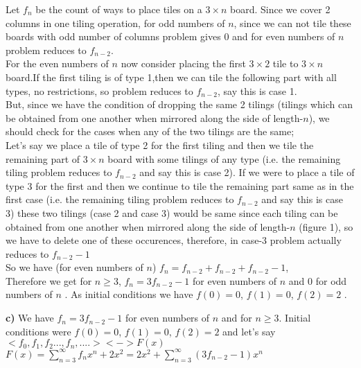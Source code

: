 \documentclass[12pt]{article}
\begin{document}
Let $f_n$ be the count of ways to place tiles on a $3\times n$ board. Since we cover 2 columns in one tiling operation, for odd numbers of $n$, since we can not tile these boards with odd number of columns problem gives $0$ and for even numbers of $n$ problem reduces to $f_{n-2}$.\\
 
For the even numbers of $n$ now consider placing the first $3\times 2$ tile to $3\times n$ board.If the first tiling is of type 1,then we can tile the following part with all types, no restrictions, so problem reduces to $f_{n-2}$, say this is case 1.\\

But, since we have the condition of dropping the same 2 tilings (tilings which can be obtained from one another when mirrored along the side of length-$n$), we should check for the cases when any of the two tilings are the same;\\

Let's say we place a tile of type 2 for the first tiling and then we tile the remaining part of $3\times n$ board with some tilings of any type (i.e. the remaining tiling problem reduces to $f_{n-2}$ and say this is case 2). If we were to place a tile of type 3 for the first and then we continue to tile the remaining part same as in the first case (i.e. the remaining tiling problem reduces to $f_{n-2}$ and say this is case 3) these two tilings (case 2 and case 3) would be same since each tiling can be obtained from one another when mirrored along the side of length-$n$ (figure 1), so we have to delete one of these occurences, therefore, in case-3 problem actually reduces to $f_{n-2}-1$\\

So we have (for even numbers of $n$) $f_n = f_{n-2} + f_{n-2} + f_{n-2}-1$,\\
Therefore we get for $n\geq 3$, $f_n = 3f_{n-2}-1$ for even numbers of $n$ and $0$ for odd numbers of $n$ . As initial conditions we have $f(0)=0$, $f(1)=0$, $f(2)=2$ .

\newpage

\textbf{c)}	We have $f_{n}=3f_{n-2}-1$ for even numbers of $n$ and for $n\geq 3$. Initial conditions were $f(0)=0$, $f(1)=0$, $f(2)=2$ and let's say$<f_{0},f_{1},f_{2}...,f_{n},....><->F(x)$\\

$F(x)=\sum_{n=3}^{\infty}f_{n}x^{n} + 2x^{2}=2x^{2}+\sum_{n=3}^{\infty}(3f_{n-2}-1)x^{n}$\\
\end{document}
